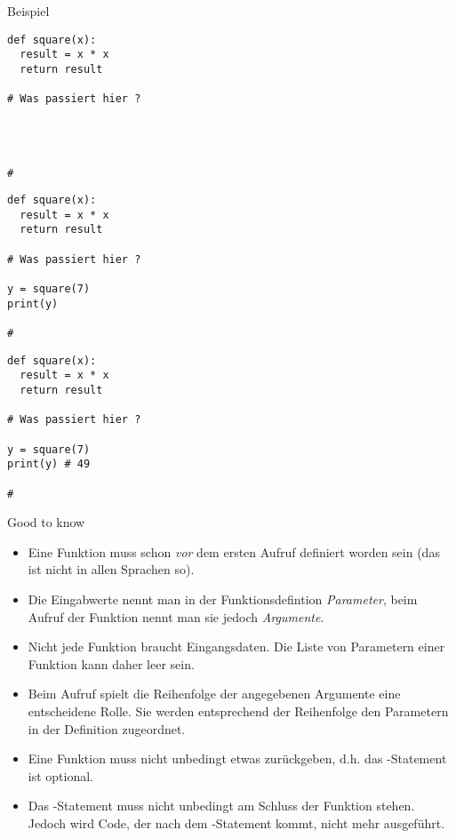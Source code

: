 \begin{fragile}
\begin{exampleblock}{Beispiel}
\vspace{2pt}

\begin{overprint}
\begin{verbatim}
def square(x): 
  result = x * x
  return result

# Was passiert hier ? 




#
\end{verbatim}
\begin{verbatim}
def square(x): 
  result = x * x
  return result

# Was passiert hier ?
 
y = square(7)
print(y) 

#
\end{verbatim}
\begin{verbatim}
def square(x): 
  result = x * x
  return result

# Was passiert hier ?
 
y = square(7)
print(y) # 49

#
\end{verbatim}
\end{overprint}
\end{exampleblock}
\end{fragile}


\begin{frame}

\begin{block}{Good to know}
\pause 
\begin{itemize}[<+->]
	\item Eine Funktion muss schon \emph{vor} dem ersten Aufruf definiert worden sein (das ist nicht in allen Sprachen so). 
	\item Die Eingabwerte nennt man in der Funktionsdefintion \emph{Parameter}, beim Aufruf der Funktion nennt man sie jedoch \emph{Argumente}.
	\item Nicht jede Funktion braucht Eingangsdaten. Die Liste von Parametern einer Funktion kann daher leer sein.   
	\item Beim Aufruf spielt die Reihenfolge der angegebenen Argumente eine entscheidene Rolle. Sie werden entsprechend der Reihenfolge den Parametern in der Definition zugeordnet. 
	\item Eine Funktion muss nicht unbedingt etwas zurückgeben, d.h. das -Statement ist optional.
	\item Das -Statement muss nicht unbedingt am Schluss der Funktion stehen. Jedoch wird Code, der nach dem -Statement kommt, nicht mehr ausgeführt. 
\end{itemize}
\end{block}
\end{frame}

